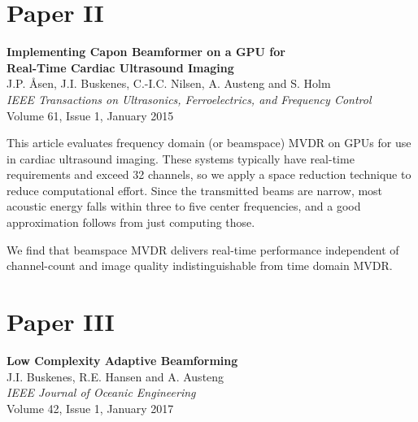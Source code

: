 \section{Paper II}\label{sec:paperII} %
\textbf{Implementing Capon Beamformer on a GPU for\\ Real-Time Cardiac Ultrasound Imaging}\\
J.P. Åsen, J.I. Buskenes, C.-I.C. Nilsen, A. Austeng and S. Holm\\
\textit{IEEE Transactions on Ultrasonics, Ferroelectrics, and Frequency Control}\\
Volume 61, Issue 1, January 2015

This article evaluates frequency domain (or beamspace) MVDR on GPUs for use in cardiac ultrasound imaging. These systems typically have real-time requirements and exceed 32 channels, so we apply a space reduction technique to reduce computational effort. Since the transmitted beams are narrow, most acoustic energy falls within three to five center frequencies, and a good approximation follows from just computing those.

We find that beamspace MVDR delivers real-time performance independent of channel-count and image quality indistinguishable from time domain MVDR.


%
%


\section{Paper III}\label{sec:paperIII} %
\textbf{Low Complexity Adaptive Beamforming}~\cite{Buskenes2014}\\
J.I. Buskenes, R.E. Hansen and A. Austeng\\
\textit{IEEE Journal of Oceanic Engineering}\\
Volume 42, Issue 1, January 2017

